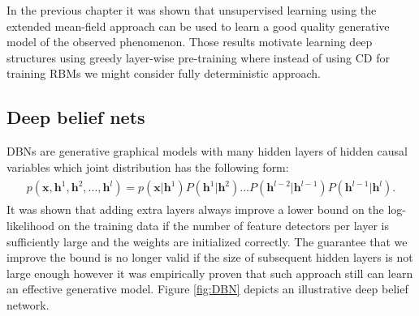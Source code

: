 In the previous chapter it was shown that unsupervised learning using the extended mean-field approach can be used to learn a good quality generative model of the observed phenomenon. Those results motivate learning deep structures using greedy layer-wise pre-training where instead of using CD for training RBMs we might consider fully deterministic approach. 

\subsection{Deep belief nets}
DBNs are generative graphical models with many hidden layers of hidden
causal variables which joint distribution has the following form:
\begin{align}
\begin{split}
p(\mathbf{x}, \mathbf{h}^1, \mathbf{h}^2,..., \mathbf{h}^l) = p(\mathbf{x}| \mathbf{h}^1)P(\mathbf{h}^1|\mathbf{h}^2)...
P(\mathbf{h}^{l-2}|\mathbf{h}^{l-1})P(\mathbf{h}^{l-1}|\mathbf{h}^{l}).
\end{split}
\end{align}
It was shown that adding extra layers always improve a lower bound on the log-likelihood on the training data if the number of feature detectors per layer is sufficiently large and the weights are initialized correctly.  The guarantee that we improve the bound is no longer valid if the size of subsequent hidden layers is not large enough however it was empirically proven that such approach still can learn an effective generative model. Figure \ref{fig:DBN} depicts an illustrative deep belief network. 

